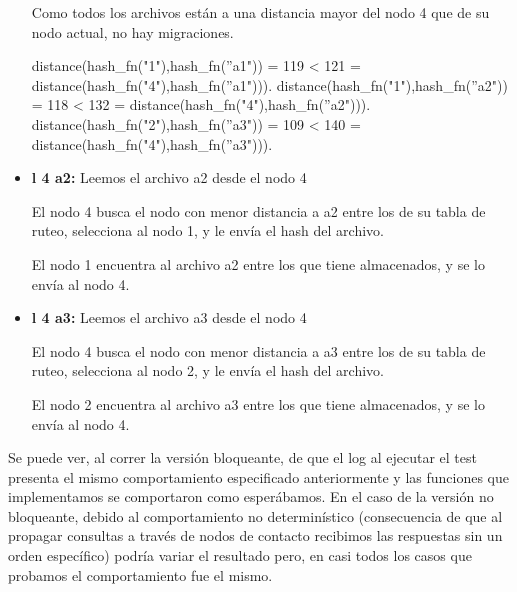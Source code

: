 \begin{itemize}
        Como todos los archivos están a una distancia mayor del nodo 4 que de su nodo actual,
        no hay migraciones.

        distance(hash\_fn("1"),hash\_fn(''a1")) = 119 < 121 = distance(hash\_fn("4"),hash\_fn(''a1"))).
        distance(hash\_fn("1"),hash\_fn(''a2")) = 118 < 132 = distance(hash\_fn("4"),hash\_fn(''a2"))).
        distance(hash\_fn("2"),hash\_fn(''a3")) = 109 < 140 = distance(hash\_fn("4"),hash\_fn(''a3"))).

    \item \textbf{l 4 a2:} Leemos el archivo a2 desde el nodo 4

        El nodo 4 busca el nodo con menor distancia a a2 entre los de su tabla de ruteo,
        selecciona al nodo 1, y le envía el hash del archivo.

        El nodo 1 encuentra al archivo a2 entre los que tiene almacenados, y se lo envía al
        nodo 4.

    \item \textbf{l 4 a3:} Leemos el archivo a3 desde el nodo 4

        El nodo 4 busca el nodo con menor distancia a a3 entre los de su tabla de ruteo,
        selecciona al nodo 2, y le envía el hash del archivo.

        El nodo 2 encuentra al archivo a3 entre los que tiene almacenados, y se lo envía al
        nodo 4.

\end{itemize}

Se puede ver, al correr la versión bloqueante, de que el log al ejecutar el test presenta el mismo comportamiento especificado anteriormente y las funciones que implementamos se comportaron como esperábamos. En el caso de la versión no bloqueante, debido al comportamiento no determinístico (consecuencia de que al propagar consultas a través de nodos de contacto recibimos las respuestas sin un orden específico) podría variar el resultado pero, en casi todos los casos que probamos el comportamiento fue el mismo.

